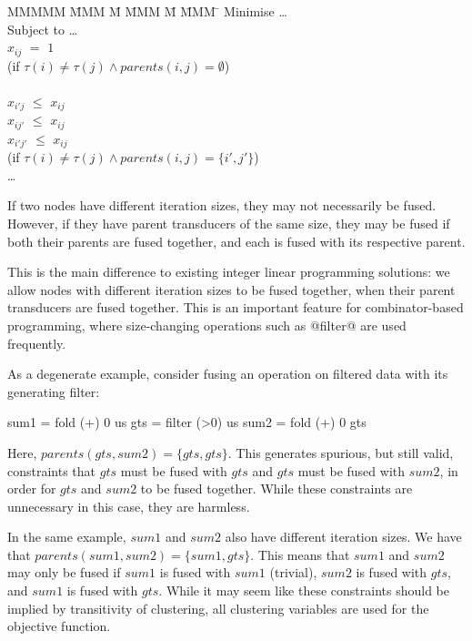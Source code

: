 \begin{tabbing}
MMMMM   \= MMM \= M \= MMM \= M \= MMM \= \kill
Minimise   \> \ldots \\
Subject to \> \ldots \\
           \> $x_{ij}$    \> $=$   \> $1$             \>       \>            \\
           \> (if $\tau(i) \not= \tau(j) \wedge parents(i,j) = \emptyset$)  \\
           \\
           \> $x_{i'j}$   \> $\le$ \> $x_{ij}$        \>       \>            \\
           \> $x_{ij'}$   \> $\le$ \> $x_{ij}$        \>       \>            \\
           \> $x_{i'j'}$   \> $\le$ \> $x_{ij}$        \>       \>            \\
           \> (if $\tau(i) \not= \tau(j) \wedge parents(i,j) = \{i',j'\}$) \\
           \> \ldots
\end{tabbing}
If two nodes have different iteration sizes, they may not necessarily be fused.
However, if they have parent transducers of the same size, they may be fused if both their parents are fused together, and each is fused with its respective parent.

This is the main difference to existing integer linear programming solutions: we allow nodes with different iteration sizes to be fused together, when their parent transducers are fused together.
This is an important feature for combinator-based programming, where size-changing operations such as @filter@ are used frequently.

As a degenerate example, consider fusing an operation on filtered data with its generating filter:
\begin{code}
sum1 = fold (+) 0  us
gts  = filter (>0) us
sum2 = fold (+) 0  gts
\end{code}
Here, $parents(gts,sum2) = \{gts, gts\}$.
This generates spurious, but still valid, constraints that $gts$ must be fused with $gts$ and $gts$ must be fused with $sum2$, in order for $gts$ and $sum2$ to be fused together.
While these constraints are unnecessary in this case, they are harmless.

In the same example, $sum1$ and $sum2$ also have different iteration sizes.
We have that $parents(sum1,sum2) = \{sum1, gts\}$.
This means that $sum1$ and $sum2$ may only be fused if $sum1$ is fused with $sum1$ (trivial), $sum2$ is fused with $gts$, and $sum1$ is fused with $gts$.
While it may seem like these constraints should be implied by transitivity of clustering, all clustering variables are used for the objective function.


